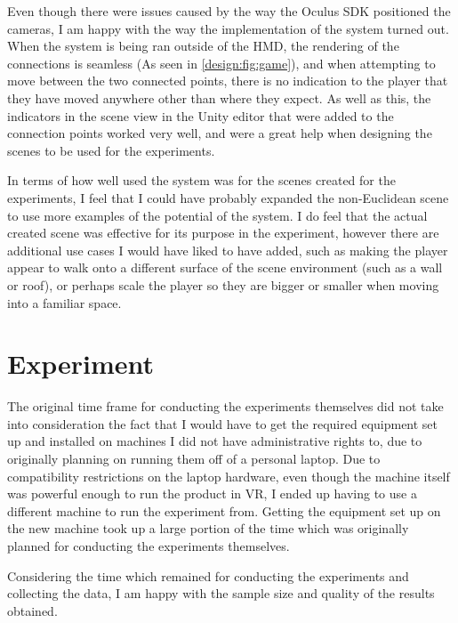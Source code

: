 		Even though there were issues caused by the way the Oculus SDK positioned the cameras, I am happy with the way the implementation of the system turned out.
		When the system is being ran outside of the HMD, the rendering of the connections is seamless (As seen in \autoref{design:fig:game}), and when attempting to move between the two connected points, there is no indication to the player that they have moved anywhere other than where they expect.
		As well as this, the indicators in the scene view in the Unity editor that were added to the connection points worked very well, and were a great help when designing the scenes to be used for the experiments.

		In terms of how well used the system was for the scenes created for the experiments, I feel that I could have probably expanded the non-Euclidean scene to use more examples of the potential of the system.
		I do feel that the actual created scene was effective for its purpose in the experiment, however there are additional use cases I would have liked to have added, such as making the player appear to walk onto a different surface of the scene environment (such as a wall or roof), or perhaps scale the player so they are bigger or smaller when moving into a familiar space. %

	\section{Experiment}

		The original time frame for conducting the experiments themselves did not take into consideration the fact that I would have to get the required equipment set up and installed on machines I did not have administrative rights to, due to originally planning on running them off of a personal laptop.
		Due to compatibility restrictions on the laptop hardware, even though the machine itself was powerful enough to run the product in VR, I ended up having to use a different machine to run the experiment from.
		Getting the equipment set up on the new machine took up a large portion of the time which was originally planned for conducting the experiments themselves.
		
		Considering the time which remained for conducting the experiments and collecting the data, I am happy with the sample size and quality of the results obtained.

